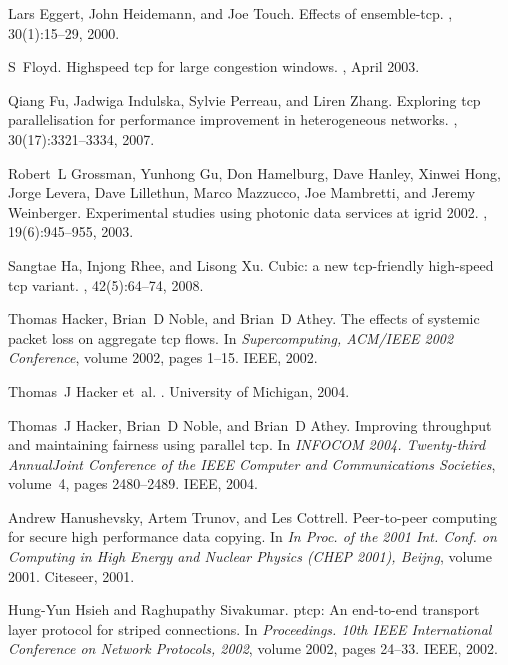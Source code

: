 \documentclass[a4paper, conference]{IEEEtran}
\begin{document}
\begin{thebibliography}{10}
Lars Eggert, John Heidemann, and Joe Touch.
\newblock Effects of ensemble-tcp.
, 30(1):15--29, 2000.

S~Floyd.
\newblock Highspeed tcp for large congestion windows.
, April 2003.

Qiang Fu, Jadwiga Indulska, Sylvie Perreau, and Liren Zhang.
\newblock Exploring tcp parallelisation for performance improvement in
  heterogeneous networks.
, 30(17):3321--3334, 2007.

Robert~L Grossman, Yunhong Gu, Don Hamelburg, Dave Hanley, Xinwei Hong, Jorge
  Levera, Dave Lillethun, Marco Mazzucco, Joe Mambretti, and Jeremy Weinberger.
\newblock Experimental studies using photonic data services at igrid 2002.
, 19(6):945--955, 2003.

Sangtae Ha, Injong Rhee, and Lisong Xu.
\newblock Cubic: a new tcp-friendly high-speed tcp variant.
, 42(5):64--74, 2008.

Thomas Hacker, Brian~D Noble, and Brian~D Athey.
\newblock The effects of systemic packet loss on aggregate tcp flows.
\newblock In {\em Supercomputing, ACM/IEEE 2002 Conference}, volume 2002, pages
  1--15. IEEE, 2002.

Thomas~J Hacker et~al.
.
\newblock University of Michigan, 2004.

Thomas~J Hacker, Brian~D Noble, and Brian~D Athey.
\newblock Improving throughput and maintaining fairness using parallel tcp.
\newblock In {\em INFOCOM 2004. Twenty-third AnnualJoint Conference of the IEEE
  Computer and Communications Societies}, volume~4, pages 2480--2489. IEEE,
  2004.

Andrew Hanushevsky, Artem Trunov, and Les Cottrell.
\newblock Peer-to-peer computing for secure high performance data copying.
\newblock In {\em In Proc. of the 2001 Int. Conf. on Computing in High Energy
  and Nuclear Physics (CHEP 2001), Beijng}, volume 2001. Citeseer, 2001.

Hung-Yun Hsieh and Raghupathy Sivakumar.
\newblock ptcp: An end-to-end transport layer protocol for striped connections.
\newblock In {\em Proceedings. 10th IEEE International Conference on Network
  Protocols, 2002}, volume 2002, pages 24--33. IEEE, 2002.


\end{thebibliography}
\end{document}

